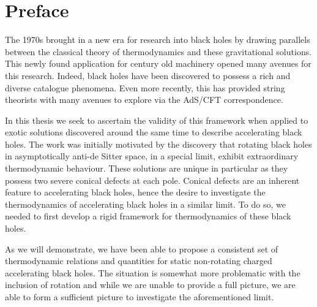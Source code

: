 \documentclass[
twoside,
openright,
frontopenright
]{dmathesis}
\begin{document}
\disableprotrusion
\tableofcontents*
\listoftodos
\enableprotrusion

\cleardoublepage
{}



\chapter*{Preface}

The 1970s brought in a new era for research into black holes by drawing
parallels between the classical theory of thermodynamics and these gravitational
solutions. This newly found application for century old machinery opened many
avenues for this research. Indeed, black holes have been discovered to possess a
rich and diverse catalogue phenomena. Even more recently, this has provided
string theorists with many avenues to explore via the AdS/CFT correspondence.

In this thesis we seek to ascertain the validity of this framework when applied
to exotic solutions discovered around the same time to describe accelerating
black holes. The work was initially motivated by the discovery that rotating
black holes in asymptotically anti-de Sitter space, in a special limit, exhibit
extraordinary thermodynamic behaviour. These solutions are unique in particular
as they possess two severe conical defects at each pole. Conical defects are an
inherent feature to accelerating black holes, hence the desire to investigate
the thermodynamics of accelerating black holes in a similar limit. To do so, we
needed to first develop a rigid framework for thermodynamics of these black
holes.

As we will demonstrate, we have been able to propose a consistent set of
thermodynamic relations and quantities for static non-rotating charged accelerating
black holes. The situation is somewhat more problematic with the inclusion of
rotation and while we are unable to provide a full picture, we are able to form
a sufficient picture to investigate the aforementioned limit.
\end{document}
